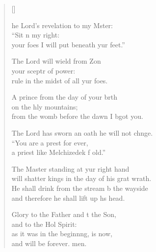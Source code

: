\settowidth{\versewidth}{will shatter kings in the day of his great wrath.}
\begin{verse}[\versewidth]
  \begin{patverse}
he Lord’s revelation to my Mster:\Flex\\
“Sit n my right:\Med\\
your foes I will put beneath yur feet.”

The Lord will wield from Z\pointup{\i}on\Flex\\
your sceptr of power:\Med\\
rule in the midst of all yur foes.

A prince from the day of your b\pointup{\i}rth\Flex\\
on the hly mountains;\Med\\
from the womb before the dawn I bgot you.

The Lord has sworn an oath he will not chnge.\Flex\\
“You are a pr\pointup{\i}est for ever,\Med\\
a priest like Melchizedek f old.”

The Master standing at yur right hand\Med\\
will shatter kings in the day of his grat wrath.\\
He shall drink from the stream b the wayside\Med\\
and therefore he shall lift up h\pointup{\i}s head.

Glory to the Father and t the Son,\Med\\
and to the Hol Spirit:\\
as it was in the beginn\pointup{\i}ng, is now,\Med\\
and will be forever. men.
  \end{patverse}
\end{verse}

